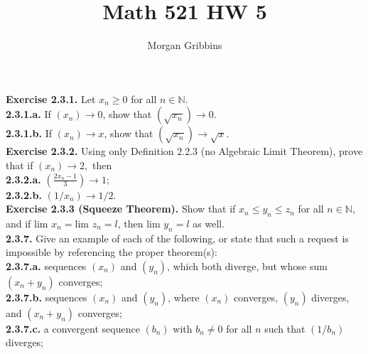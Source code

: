 \documentclass[12pt,letterpaper]{article}
\title{Math 521 HW 5}
\author{Morgan Gribbins}
\date{}
\begin{document}
	
\maketitle

\textbf{Exercise 2.3.1.} Let \(x_{n} \geq 0\) for all \(n \in \mathbb{N}\). \\

\textbf{2.3.1.a.} If \((x_{n}) \to 0\), show that \( ( \sqrt{x_{n}} ) \to 0\). \\



\textbf{2.3.1.b.} If \((x_{n}) \to x\), show that \((\sqrt{x_{n}}) \to \sqrt{x}\). \\



\textbf{Exercise 2.3.2.} Using only Definition 2.2.3 (no Algebraic Limit Theorem), prove that if \((x_{n}) \to 2, \) then \\

\textbf{2.3.2.a.} \((\frac{2x_{n}-1}{3}) \to 1\); \\



\textbf{2.3.2.b.} \((1/x_{n}) \to 1/2\). \\



\textbf{Exercise 2.3.3 (Squeeze Theorem).} Show that if \(x_{n} \leq y_{n} \leq z_{n} \) for all \(n \in \mathbb{N}\), and if \(\text{lim } x_{n} = \text{lim }z_{n} = l\), then \(\text{lim } y_{n} = l\) as well. \\



\textbf{2.3.7.} Give an example of each of the following, or state that such a request is impossible by referencing the proper theorem(s): \\

\textbf{2.3.7.a.} sequences \((x_{n})\) and \((y_{n})\), which both diverge, but whose sum \((x_{n} + y_{n})\) converges; \\



\textbf{2.3.7.b.} sequences \((x_{n})\) and \((y_{n})\), where \((x_{n})\) converges, \((y_{n})\) diverges, and \((x_{n} + y_{n})\) converges; \\



\textbf{2.3.7.c.} a convergent sequence \((b_{n})\) with \(b_{n} \neq 0\) for all \(n\) such that \((1/b_{n})\) diverges; \\
\end{document}
